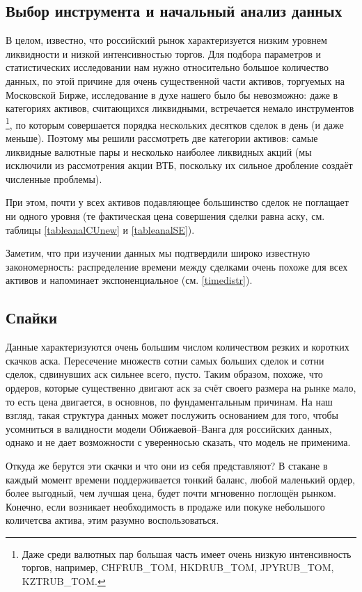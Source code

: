 \subsection{Выбор инструмента и начальный анализ данных} \label{InitAnal}
В целом, известно, что российский рынок характеризуется низким уровнем ликвидности и низкой интенсивностью торгов. 
Для подбора параметров и статистических исследовании
нам нужно относительно большое количество данных, по этой причине
для очень существенной части активов, торгуемых на Московской Бирже, 
исследование в духе нашего было бы невозможно: даже в категориях 
активов, считающихся ликвидными,
встречается немало инструментов \footnote{Даже среди валютных пар большая 
часть имеет очень низкую интенсивность торгов, например, CHFRUB\_TOM, HKDRUB\_TOM, 
JPYRUB\_TOM, KZTRUB\_TOM.}, по которым совершается порядка нескольких десятков сделок в день (и даже меньше). 
Поэтому мы решили рассмотреть две категории активов: самые ликвидные валютные пары
и несколько наиболее ликвидных акций (мы исключили из рассмотрения акции ВТБ, поскольку их сильное дробление создаёт 
численные проблемы).
\par
При этом, почти у всех активов подавляющее большинство сделок не поглащает ни одного уровня 
(те фактическая цена совершения сделки равна аску, см. таблицы \ref{tableanalCUnew} и \ref{tableanalSE}). 
\par
Заметим, что при изучении данных мы подтвердили широко известную закономерность: 
распределение времени между сделками очень похоже для всех активов и напоминает экспоненциальное 
(см. \ref{timedistr}).


\subsection{Спайки}

Данные характеризуются очень большим числом количеством резких и коротких скачков аска. 
Пересечение множеств
сотни самых больших сделок и сотни сделок, сдвинувших аск сильнее всего, пусто. Таким образом, похоже, что ордеров,
которые существенно двигают аск за счёт своего размера на рынке мало, то есть цена двигается, в основнов, по фундаментальным причинам.
На наш взгляд, такая структура данных может послужить основанием для того, чтобы усомниться в валидности модели Обижаевой--Ванга 
для российских данных, однако и не дает возможности с уверенносью сказать, что модель не применима. 
\par
Откуда же берутся эти скачки и что они из себя представляют? В стакане в каждый момент времени поддерживается тонкий баланс, любой
маленький ордер, более выгодный, чем лучшая цена, будет почти мгновенно поглощён рынком. Конечно, если возникает необходимость в продаже
или покуке небольшого количетсва актива, этим разумно воспользоваться.

